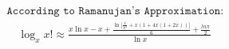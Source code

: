 \documentclass[11pt]{article}
\theoremstyle{definition}
\theoremstyle{remark}
\begin{document}
\small
\[
\begin{aligned}
& \\
& \texttt{According to Ramanujan's Approximation: } \\
& \quad \log_xx! \approx \frac{x\ln x - x + \frac{\ln\biggl[\frac{1}{\pi^3} + x(1+4x(1+2x)) \biggr]}{6} + \frac{ln\pi}{2}}{\ln x} \\
\end{aligned}
\]
\end{document}
